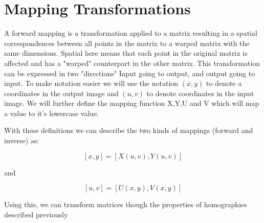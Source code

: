 \section{Mapping Transformations}

A forward mapping is a transformation applied to a matrix resulting in a
spatial correspondences between all points in the matrix to a warped
matrix with the same dimensions. Spatial here means that each point in the
original matrix is affected and has a "warped" counterpart in the other
matrix. This transformation can be expressed in two "directions" Input going
to output, and output going to input. 
To make notation easier we will use the notation $(x,y)$ to denote a
coordinates in the output image and $(u,v)$ to denote coordinates in the input
image. We will further define the mapping function X,Y,U and V which will map a
value to it's lowercase value. 

With these definitions we can describe the two kinds of mappings (forward and
inverse) as:

$$[x, y] = [X (u,v),Y(u, v)]$$

and

$$[u,v] = [U(x, y),V (x, y)]$$

Using this, we can transform matrices though the properties of
homographies described previously
